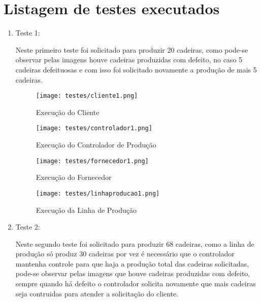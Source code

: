 \documentclass[brazil, a4paper,12pt]{article}
\begin{document}
\section{Listagem de testes executados}

\begin{enumerate}

\vfill

\item Teste 1:

Neste primeiro teste foi solicitado para produzir 20 cadeiras, como pode-se observar pelas imagens houve cadeiras produzidas com defeito, no caso 5 cadeiras defeituosas e com isso foi solicitado novamente a produção de mais 5 cadeiras.

\begin{figure}[h]
\centering\texttt{[image: testes/cliente1.png]}
\caption{Execuç\~ao do Cliente}
\label{fig:cliente1}
\end{figure}

\begin{figure}[h]
\centering\texttt{[image: testes/controlador1.png]}
\caption{Execuç\~ao do Controlador de Produç\~ao}
\label{fig:controlador1}
\end{figure}

\begin{figure}[h]
\centering\texttt{[image: testes/fornecedor1.png]}
\caption{Execuç\~ao do Fornecedor}
\label{fig:fornecedor1}
\end{figure}

\begin{figure}[h]
\centering\texttt{[image: testes/linhaproducao1.png]}
\caption{Execuç\~ao da Linha de Produç\~ao}
\label{fig:linhaproducao1}
\end{figure}

\vfill
\clearpage


\vfill

\item Teste 2:

Neste segundo teste foi solicitado para produzir 68 cadeiras, como a linha de produção só produz 30 cadeiras por vez é necessário que o controlador mantenha controle para que haja a produção total das cadeiras solicitadas, pode-se observar pelas imagens que houve cadeiras produzidas com defeito, sempre quando há defeito o controlador solicita novamente que mais cadeiras seja contruidas para atender a solicitação do cliente.


\end{enumerate}
\end{document}
